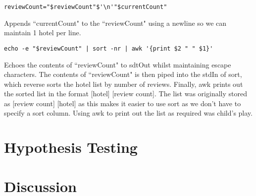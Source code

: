 \documentclass[a4paper]{article}
\begin{document}
\begin{lstlisting}
reviewCount="$reviewCount"$'\n'"$currentCount"
\end{lstlisting}
Appends ``currentCount" to the ``reviewCount" using a newline so we can maintain 1 hotel per line.

\begin{lstlisting}
echo -e "$reviewCount" | sort -nr | awk '{print $2 " " $1}'
\end{lstlisting}
Echoes the contents of ``reviewCount" to sdtOut whilst maintaining escape characters.
The contents of ``reviewCount" is then piped into the stdIn of sort, which reverse sorts the hotel list by number of reviews.
Finally, awk prints out the sorted list in the format [hotel] [review count].
The list was originally stored as [review count] [hotel] as this makes it easier to use sort as we don't have to specify a sort column.
Using awk to print out the list as required was child's play.

\newpage
\section{Hypothesis Testing}

\newpage
\section{Discussion}
\end{document}
